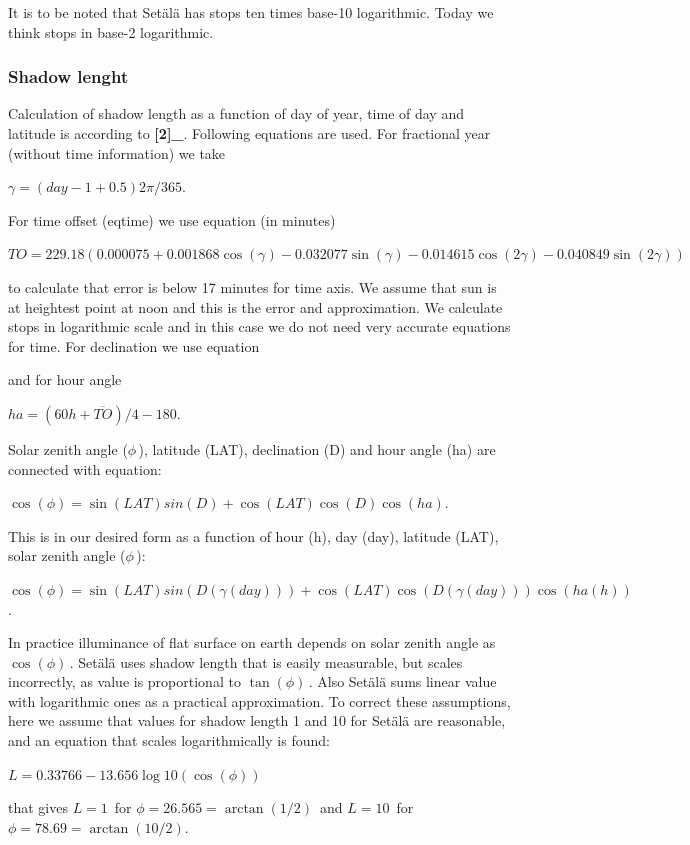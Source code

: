 \documentclass[a4paper,11pt,english]{sphinxmanual}
\begin{document}
It is to be noted that Setälä has stops ten times base-10 logarithmic.
Today we think stops in base-2 logarithmic.


\subsubsection{Shadow lenght}
\label{examples/examples:shadow-lenght}
Calculation of shadow length as a function of day of year, time of day
and latitude is according to  {\color{red}\bfseries{}{[}2{]}\_}. Following equations are used. For
fractional year (without time information) we take

\(\gamma = (day-1+0.5)2\pi /365.\)

For time offset (eqtime) we use equation (in minutes)

\(TO = 229.18(0.000075+0.001868\cos(\gamma)-0.032077\sin(\gamma)-0.014615\cos(2\gamma)-0.040849\sin(2\gamma))\)

to calculate that error is below 17 minutes for time axis. We assume
that sun is at heightest point at noon and this is the error and
approximation. We calculate stops in logarithmic scale and in this case
we do not need very accurate equations for time. For declination we use
equation

and for hour angle

\(ha=(60h+\overline{TO})/4-180. \,\)

Solar zenith angle (\(\phi \,\)), latitude (LAT),
declination (D) and hour angle (ha) are connected with equation:

\(\cos (\phi ) = \sin(LAT)sin(D)+\cos(LAT)\cos(D)\cos(ha). \,\)

This is in our desired form as a function of hour (h), day (day),
latitude (LAT), solar zenith angle (\(\phi \,\)):

\(\cos (\phi ) = \sin(LAT)sin(D(\gamma(day)))+\cos(LAT)\cos(D(\gamma(day)))\cos(ha(h)) \,\).

In practice illuminance of flat surface on earth depends on solar zenith
angle as \(\cos(\phi)\,\). Setälä uses shadow length that is
easily measurable, but scales incorrectly, as value is proportional to
\(\tan(\phi)\,\). Also Setälä sums linear value with
logarithmic ones as a practical approximation. To correct these
assumptions, here we assume that values for shadow length 1 and 10 for Setälä
are reasonable, and an equation that scales logarithmically is found:

\(L = 0.33766 - 13.656 \log10 (\cos(\phi)) \,\)

that gives \(L=1\,\) for \(\phi = 26.565 =\arctan(1/2)\,\) and \(L=10\,\) for \(\phi = 78.69 =\arctan(10/2).\,\)
\end{document}
